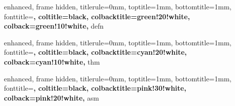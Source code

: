 
{
    enhanced, frame hidden, titlerule=0mm, toptitle=1mm, bottomtitle=1mm,
    fonttitle=\bfseries\large, coltitle=black,
    colbacktitle=green!20!white, colback=green!10!white,
}{defn}


{
    enhanced, frame hidden, titlerule=0mm, toptitle=1mm, bottomtitle=1mm,
    fonttitle=\bfseries\large, coltitle=black,
    colbacktitle=cyan!20!white, colback=cyan!10!white,
}{thm}


\newenvironment{thmpf}{
	{\noindent{\it \textbf{定理的证明}}}
	\tcolorbox[blanker,breakable,left=5mm,parbox=false,top=8pt,
    before upper={\parindent15pt}, after skip=10pt,
	borderline west={1mm}{0pt}{cyan!20!white}]
}{
    \textcolor{cyan!20!white}{\hbox{}\nobreak\hfill$\blacksquare$}
    \endtcolorbox
}

\NewDocumentCommand{\thmp}{m+m+m}{
    \begin{mytheorem}{#1}{}#2\end{mytheorem}
    \begin{thmpf}#3\end{thmpf}
}

{
    enhanced, frame hidden, titlerule=0mm, toptitle=1mm, bottomtitle=1mm,
    fonttitle=\bfseries\large, coltitle=black,
    colbacktitle=pink!30!white, colback=pink!20!white,
}{asm}


